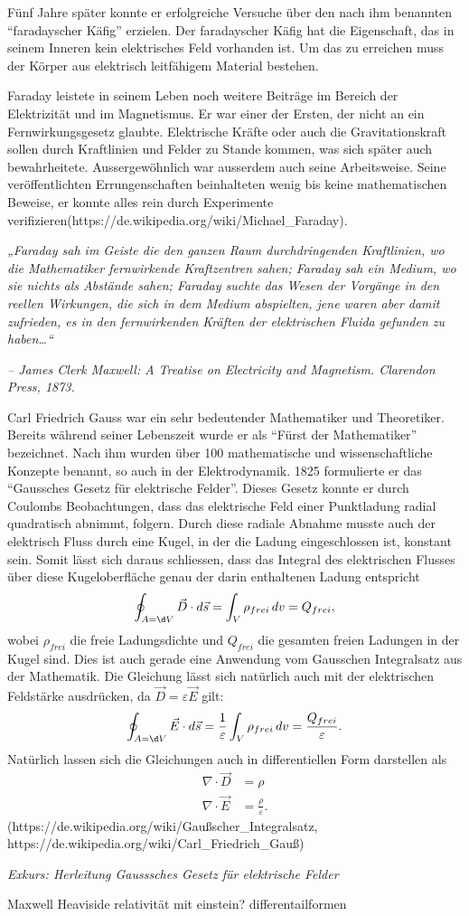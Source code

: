 Fünf Jahre später konnte er erfolgreiche Versuche über den nach ihm benannten ``faradayscher Käfig'' erzielen.
Der faradayscher Käfig hat die Eigenschaft, das in seinem Inneren kein elektrisches Feld vorhanden ist.
Um das zu erreichen muss der Körper aus elektrisch leitfähigem Material bestehen.

Faraday leistete in seinem Leben noch weitere Beiträge im Bereich der Elektrizität und im Magnetismus. 
Er war einer der Ersten, der nicht an ein Fernwirkungsgesetz glaubte.
Elektrische Kräfte oder auch die Gravitationskraft sollen durch Kraftlinien und Felder zu Stande kommen, was sich später auch bewahrheitete.
Aussergewöhnlich war ausserdem auch seine Arbeitsweise.
Seine veröffentlichten Errungenschaften beinhalteten wenig bis keine mathematischen Beweise, er konnte alles rein durch Experimente verifizieren(https://de.wikipedia.org/wiki/Michael\_Faraday).

\begin{center}
\textit{„Faraday sah im Geiste die den ganzen Raum durchdringenden Kraftlinien, wo die Mathematiker fernwirkende Kraftzentren sahen; Faraday sah ein Medium, wo sie nichts als Abstände sahen; Faraday suchte das Wesen der Vorgänge in den reellen Wirkungen, die sich in dem Medium abspielten, jene waren aber damit zufrieden, es in den fernwirkenden Kräften der elektrischen Fluida gefunden zu haben…“}

\textit{– James Clerk Maxwell: A Treatise on Electricity and Magnetism. Clarendon Press, 1873.}
\end{center}

Carl Friedrich Gauss war ein sehr bedeutender Mathematiker und Theoretiker.
Bereits während seiner Lebenszeit wurde er als ``Fürst der Mathematiker'' bezeichnet.
Nach ihm wurden über 100 mathematische und wissenschaftliche Konzepte benannt, so auch in der Elektrodynamik.
1825 formulierte er das ``Gaussches Gesetz für elektrische Felder''.
Dieses Gesetz konnte er durch Coulombs Beobachtungen, dass das elektrische Feld einer Punktladung radial quadratisch abnimmt, folgern.
Durch diese radiale Abnahme musste auch der elektrisch Fluss durch eine Kugel, in der die Ladung eingeschlossen ist, konstant sein.
Somit lässt sich daraus schliessen, dass das Integral des elektrischen Flusses über diese Kugeloberfläche genau der darin enthaltenen Ladung entspricht
\[
\oint_{A=\d V} \vec{D} \cdot d\vec{s}
=
\int_{V} \rho_{frei}\, dv
=
Q_{frei} ,
\]
wobei $\rho_{frei}$ die freie Ladungsdichte und $Q_{frei}$ die gesamten freien Ladungen in der Kugel sind. Dies ist auch gerade eine Anwendung vom Gausschen Integralsatz aus der Mathematik.
Die Gleichung lässt sich natürlich auch mit der elektrischen Feldstärke ausdrücken, da $\vec{D} = \varepsilon \vec{E}$ gilt:
\[
\oint_{A=\d V} \vec{E} \cdot d\vec{s}
=
\frac{1}{\varepsilon}\int_{V} \rho_{frei}\, dv
=
\frac{Q_{frei}}{\varepsilon} .
\]
Natürlich lassen sich die Gleichungen auch in differentiellen Form darstellen als
\begin{align*}
	\nabla \cdot \vec{D}
	&=
	\rho
	\\
	\nabla \cdot \vec{E}
	&=
	\frac{\rho}{\varepsilon} .
\end{align*}
(https://de.wikipedia.org/wiki/Gaußscher\_Integralsatz, https://de.wikipedia.org/wiki/Carl\_Friedrich\_Gauß)


\textit{Exkurs: Herleitung Gausssches Gesetz für elektrische Felder}






Maxwell
Heaviside
relativität mit einstein?
differentailformen

